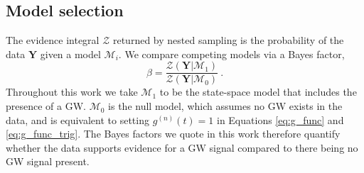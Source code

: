 \documentclass[fleqn,usenatbib,useAMS]{mnras}
\begin{document}

\subsection{Model selection}\label{sec:model_selection}
The evidence integral $\mathcal{Z}$ returned by nested sampling is the probability of the data $\boldsymbol{Y}$ given a model $\mathcal{M}_i$. We compare competing models via a Bayes factor,
\begin{equation}
	\beta = \frac{\mathcal{Z}(\boldsymbol{Y} | \mathcal{M}_1)}{\mathcal{Z}(\boldsymbol{Y} | \mathcal{M}_0)} \ . \label{eq:bayes}
\end{equation}
Throughout this work we take $\mathcal{M}_1$ to be the state-space model that includes the presence of a GW. $\mathcal{M}_0$ is the null model, which assumes no GW exists in the data, and is equivalent to setting $g^{(n)}(t)=1$ in Equations \eqref{eq:g_func} and \eqref{eq:g_func_trig}. The Bayes factors we quote in this work therefore quantify whether the data supports evidence for a GW signal compared to there being no GW signal present.
\end{document}
